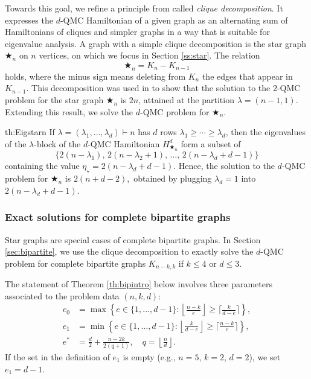 \documentclass[12pt,dvipsnames,accepted=2016-08-18,a4paper,onecolumn]{quantumarticle}
\def\starn{{\bigstar_{n}}}
\newcommand{\floor}[1]{\left\lfloor #1 \right\rfloor}
\numberwithin{equation}{section}
\theoremstyle{definition}
\begin{document}
Towards this goal, we refine a principle from \cite{BCEHK24} called \textit{clique decomposition}. 
It expresses the $d$-QMC Hamiltonian of a given graph as an alternating sum of Hamiltonians of cliques and simpler graphs in a way that is suitable for eigenvalue analysis. A graph with a simple clique decomposition is the star graph $\starn$ on $n$ vertices, on which we focus in Section \ref{ss:star}.
The relation
$$
 \starn = K_n - K_{n-1}
$$
holds, where the minus sign means deleting from $K_n$ the edges that appear in $K_{n-1}.$
This decomposition was used in \cite{BCEHK24} to show that the solution to the $2$-QMC problem for the star graph $\starn$ is $2n$, attained at the partition $\lambda=(n-1,1)$.
Extending this result, we solve the $d$-QMC problem for $\starn.$
\begin{repthm}{th:Eigstarn}
    If $\lambda = (\lambda_1,\ldots, \lambda_d) \vdash n$ has $d$ rows $\lambda_1 \geq \cdots \geq \lambda_d$, then the eigenvalues of the $\lambda$-block of the $d$-QMC Hamiltonian $H^d_\starn$  form a subset of 
$$
\{2(n-\lambda_1), \,2(n-\lambda_2+1),\, \ldots,\, 2(n-\lambda_d+d-1)\}
$$
containing the value $\eta_\star = 2(n-\lambda_d + d-1).$ Hence, the solution to the $d$-QMC problem for $\starn$ is $2(n + d-2),$ obtained by plugging $\lambda_d=1$ into $2(n-\lambda_d + d-1).$
\end{repthm}

\subsubsection{Exact solutions for complete bipartite graphs}

Star graphs are special cases of complete bipartite graphs.
In Section \ref{sec:bipartite}, we use the clique decomposition to exactly solve the $d$-QMC problem for complete bipartite graphs $K_{n-k,k}$ if $k\le 4$ or $d\le 3$.

The statement of Theorem \ref{th:bipintro} below involves three parameters associated to the problem data $(n,k,d)$: 
\begin{equation}\label{eq:defe0intro}
\begin{split}
    e_0 & =\max \left\{e\in\{1,\ldots,d-1\} \colon \floor{\frac{n-k}e} \geq \bigg\lceil\frac{k}{d-e}\bigg\rceil  \right\},\\
    e_1 & =\min \left\{e\in\{1,\ldots,d-1\} \colon
\floor{\frac{k}{d-e}} \geq 
     \bigg\lceil\frac{n-k}e\bigg\rceil \right\}, \\
    e^* & = \frac{d}{2} + \frac{n-2k}{2(q+1)}, \quad 
    q=\floor{\frac nd}.
\end{split}
\end{equation}
If the set in the definition of $e_1$ is empty
(e.g., $n=5$, $k=2$, $d=2$), we set $e_1=d-1$. 
\end{document}
